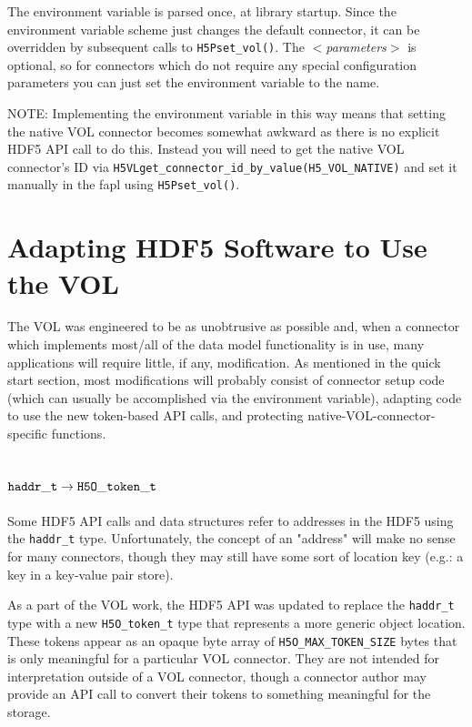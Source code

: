 The environment variable is parsed once, at library startup. Since the environment variable scheme just changes the default connector, it can be overridden by subsequent calls to {\tt H5Pset\_vol()}. The \textit{$<$parameters$>$} is optional, so for connectors which do not require any special configuration parameters you can just set the environment variable to the name.

NOTE: Implementing the environment variable in this way means that setting the native VOL connector becomes somewhat awkward as there is no explicit HDF5 API call to do this. Instead you will need to get the native VOL connector's ID via {\tt H5VLget\_connector\_id\_by\_value(H5\_VOL\_NATIVE)} and set it manually in the fapl using {\tt H5Pset\_vol()}.

\section{Adapting HDF5 Software to Use the VOL}

The VOL was engineered to be as unobtrusive as possible and, when a connector which implements most/all of the data model functionality is in use, many applications will require little, if any, modification. As mentioned in the quick start section, most modifications will probably consist of connector setup code (which can usually be accomplished via the environment variable), adapting code to use the new token-based API calls, and protecting native-VOL-connector-specific functions.

\subsection{${\tt haddr\_t} \rightarrow {\tt H5O\_token\_t}$}

Some HDF5 API calls and data structures refer to addresses in the HDF5 using the {\tt haddr\_t} type.
Unfortunately, the concept of an "address" will make no sense for many connectors,
though they may still have some sort of location key (e.g.: a key in a key-value
pair store).

As a part of the VOL work, the HDF5 API was updated to replace the {\tt haddr\_t}
type with a new {\tt H5O\_token\_t} type that represents a more generic object location.
These tokens appear as an opaque byte array of {\tt H5O\_MAX\_TOKEN\_SIZE} bytes that
is only meaningful for a particular VOL connector. They are not intended for
interpretation outside of a VOL connector, though a connector author may provide
an API call to convert their tokens to something meaningful for the storage.

